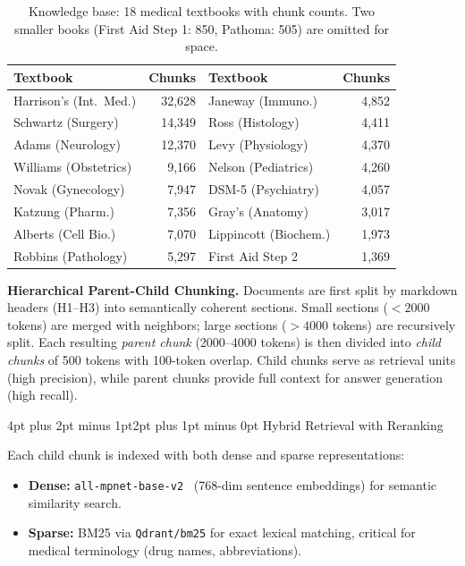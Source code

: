 \documentclass[10pt,twocolumn,letterpaper]{article}
\makeatletter
\renewcommand\subsection{\@startsection{subsection}{2}{\z@}%
  {4pt plus 2pt minus 1pt}{2pt plus 1pt minus 0pt}%
  {\normalsize\bfseries}}
\makeatother
\begin{document}
\begin{table}[h]
\centering
\small
\setlength{\tabcolsep}{3pt}
\begin{tabular}{lrlr}
\toprule
\textbf{Textbook} & \textbf{Chunks} & \textbf{Textbook} & \textbf{Chunks} \\
\midrule
Harrison's (Int.\ Med.) & 32,628 & Janeway (Immuno.) & 4,852 \\
Schwartz (Surgery) & 14,349 & Ross (Histology) & 4,411 \\
Adams (Neurology) & 12,370 & Levy (Physiology) & 4,370 \\
Williams (Obstetrics) & 9,166 & Nelson (Pediatrics) & 4,260 \\
Novak (Gynecology) & 7,947 & DSM-5 (Psychiatry) & 4,057 \\
Katzung (Pharm.) & 7,356 & Gray's (Anatomy) & 3,017 \\
Alberts (Cell Bio.) & 7,070 & Lippincott (Biochem.) & 1,973 \\
Robbins (Pathology) & 5,297 & First Aid Step 2 & 1,369 \\
\bottomrule
\end{tabular}
\vspace{2pt}
\caption{Knowledge base: 18 medical textbooks with chunk counts. Two smaller books (First Aid Step 1: 850, Pathoma: 505) are omitted for space.}
\label{tab:textbooks}
\end{table}

\textbf{Hierarchical Parent-Child Chunking.} Documents are first split by markdown headers (H1--H3) into semantically coherent sections. Small sections (${<}2000$ tokens) are merged with neighbors; large sections (${>}4000$ tokens) are recursively split. Each resulting \textit{parent chunk} (2000--4000 tokens) is then divided into \textit{child chunks} of 500 tokens with 100-token overlap. Child chunks serve as retrieval units (high precision), while parent chunks provide full context for answer generation (high recall).

\subsection{Hybrid Retrieval with Reranking}

Each child chunk is indexed with both dense and sparse representations:
\begin{itemize}[nosep,leftmargin=*]
  \item \textbf{Dense:} \texttt{all-mpnet-base-v2}~\cite{reimers2019sentence} (768-dim sentence embeddings) for semantic similarity search.
  \item \textbf{Sparse:} BM25 via \texttt{Qdrant/bm25} for exact lexical matching, critical for medical terminology (drug names, abbreviations).
\end{itemize}
\end{document}
